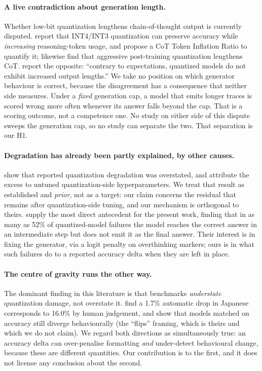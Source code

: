 \documentclass[11pt]{article}
\begin{document}
\paragraph{A live contradiction about generation length.}
Whether low-bit quantization lengthens chain-of-thought output is currently
disputed. \citet{lian2026inflates} report that INT4/INT3 quantization can
preserve accuracy while \emph{increasing} reasoning-token usage, and propose a
CoT Token Inflation Ratio to quantify it; \citet{lotfi2026longer} likewise find
that aggressive post-training quantization lengthens CoT. \citet{liu2025quantization}
report the opposite: ``contrary to expectations, quantized models do not exhibit
increased output lengths.'' We take no position on which generator behaviour is
correct, because the disagreement has a consequence that neither side measures.
Under a \emph{fixed} generation cap, a model that emits longer traces is scored
wrong more often whenever its answer falls beyond the cap. That is a scoring outcome,
not a competence one. No study on either side of this dispute sweeps the
generation cap, so no study can separate the two. That separation is our H1.

\paragraph{Degradation has already been partly explained, by other causes.}
\citet{kurtic2025bf16} show that reported quantization degradation was
overstated, and attribute the excess to untuned quantization-side
hyperparameters. We treat that result as established and \emph{prior}, not as a
target: our claim concerns the residual that remains after quantization-side
tuning, and our mechanism is orthogonal to theirs. \citet{lotfi2026longer}
supply the most direct antecedent for the present work, finding that in as many
as 52\% of quantized-model failures the model reaches the correct answer in an
intermediate step but does not emit it as the final answer. Their interest is in
fixing the generator, via a logit penalty on overthinking markers; ours is in
what such failures do to a reported accuracy delta when they are left in place.

\paragraph{The centre of gravity runs the other way.}
The dominant finding in this literature is that benchmarks \emph{understate}
quantization damage, not overstate it. \citet{marchisio2024multilingual} find a
1.7\% automatic drop in Japanese corresponds to 16.0\% by human judgement, and
\citet{dutta2024accuracy} show that models matched on accuracy still diverge
behaviourally (the ``flips'' framing, which is theirs and which we do not
claim). We regard both directions as simultaneously true: an accuracy delta can
over-penalise formatting \emph{and} under-detect behavioural change, because
these are different quantities. Our contribution is to the first, and it does
not license any conclusion about the second.
\end{document}
